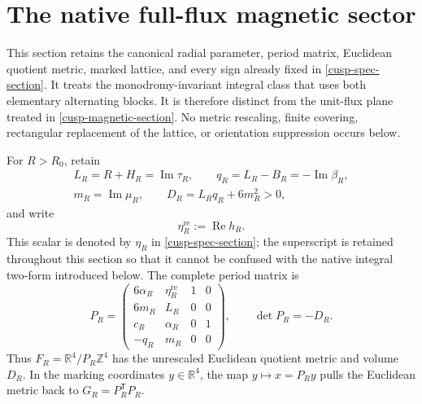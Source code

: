 
\section{The native full-flux magnetic sector}
\label{cusp-native-full-flux-section}

This section retains the canonical radial parameter, period matrix, Euclidean
quotient metric, marked lattice, and every sign already fixed in
\cref{cusp-spec-section}.  It treats the monodromy-invariant integral class
that uses both elementary alternating blocks.  It is therefore distinct from
the unit-flux plane treated in \cref{cusp-magnetic-section}.  No metric
rescaling, finite covering, rectangular replacement of the lattice, or
orientation suppression occurs below.

For \(R>R_0\), retain
\begin{equation}
 \begin{gathered}
 L_R=R+H_R=\operatorname{Im}\tau_R,
 \qquad q_R=L_R-B_R=-\operatorname{Im}\beta_R,\\
 m_R=\operatorname{Im}\mu_R,
 \qquad D_R=L_Rq_R+6m_R^2>0,
 \end{gathered}
 \label{cusp-native-full-flux-canonical-scalars}
\end{equation}
and
write
\[
 \eta_R^{\mathrm{re}}:=\operatorname{Re}h_R.
\]
This scalar is denoted by \(\eta_R\) in
\cref{cusp-spec-section}; the superscript is retained throughout this
section so that it cannot be confused with the native integral two-form
introduced below.  The complete period matrix is
\begin{equation}
 P_R=
 \begin{pmatrix}
  6\alpha_R&\eta_R^{\mathrm{re}}&1&0\\
  6m_R&L_R&0&0\\
  c_R&\alpha_R&0&1\\
  -q_R&m_R&0&0
 \end{pmatrix},
 \qquad \det P_R=-D_R.
 \label{cusp-native-full-flux-period-matrix}
\end{equation}
Thus \(F_R=\mathbb R^4/P_R\mathbb Z^4\) has the unrescaled Euclidean quotient
metric and volume \(D_R\).  In the marking coordinates \(y\in\mathbb R^4\),
the map \(y\mapsto x=P_Ry\) pulls the Euclidean metric back to
\(G_R=P_R^{\mathsf T}P_R\).

